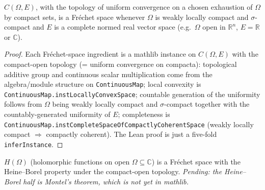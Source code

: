 \begin{theorem}
  \label{thm:CO-frechet}
  \leanok
  $C(\Omega, E)$, with the topology of uniform convergence on a chosen
  exhaustion of $\Omega$ by compact sets, is a Fréchet space whenever
  $\Omega$ is weakly locally compact and $\sigma$-compact and $E$ is a
  complete normed real vector space (e.g.\ $\Omega$ open in $\mathbb
  R^n$, $E = \mathbb R$ or $\mathbb C$).
\end{theorem}
\begin{proof}
  \leanok
  Each Fréchet-space ingredient is a mathlib instance on $C(\Omega,
  E)$ with the compact-open topology (= uniform convergence on
  compacta):
  topological additive group and continuous scalar multiplication
  come from the algebra/module structure on \texttt{ContinuousMap};
  local convexity is \texttt{ContinuousMap.instLocallyConvexSpace};
  countable generation of the uniformity follows from
  $\Omega$ being weakly locally compact and $\sigma$-compact together
  with the countably-generated uniformity of $E$;
  completeness is \texttt{ContinuousMap.instCompleteSpaceOfCompactly\-CoherentSpace}
  (weakly locally compact $\Rightarrow$ compactly coherent). The
  Lean proof is just a five-fold \texttt{inferInstance}.
\end{proof}

\begin{theorem}
  \label{thm:H-omega-frechet-HB}
  $H(\Omega)$ (holomorphic functions on open $\Omega \subseteq
  \mathbb C$) is a Fréchet space with the Heine--Borel property under
  the compact-open topology. \emph{Pending: the Heine--Borel half is
  Montel's theorem, which is not yet in mathlib.}
\end{theorem}


